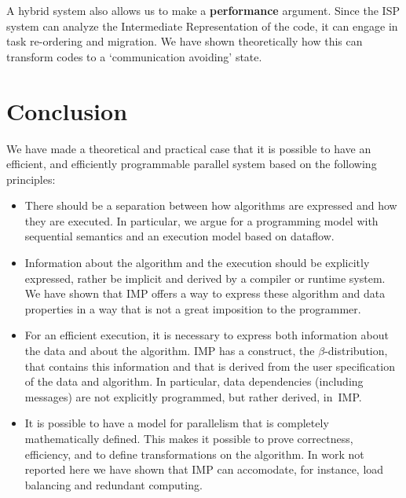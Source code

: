\documentclass[11pt,fleqn,preprint]{impreport}
\begin{document}
A hybrid system also allows us to make a \textbf{performance} argument. Since
the ISP system can analyze the Intermediate Representation of the
code, it can engage in task re-ordering and migration. We have shown
theoretically how this can transform codes to a `communication
avoiding' state.

\section{Conclusion}

We have made a theoretical and practical case that it is possible
to have an efficient, and efficiently programmable parallel system
based on the following principles:
\begin{itemize}
\item There should be a separation between how algorithms are expressed
  and how they are executed. In particular, we argue for a programming
  model with sequential semantics and an execution model based on dataflow.
\item Information about the algorithm and the execution should be
  explicitly expressed, rather be implicit and derived by a compiler
  or runtime system. We have shown that \ac{IMP} offers a way to
  express these algorithm and data properties in a way that is not a great
  imposition to the programmer.
\item For an efficient execution, it is necessary to express both
  information about the data and about the algorithm. \ac{IMP} has
  a construct, the $\beta$-distribution, that contains this information
  and that is derived from the user specification of the data and algorithm.
  In particular, data dependencies (including messages) are not explicitly
  programmed, but rather derived, in~\ac{IMP}.
\item It is possible to have a model for parallelism that is completely
  mathematically defined. This makes it possible to prove correctness, efficiency,
  and to define transformations on the algorithm. In work not reported here
  we have shown that \ac{IMP} can accomodate, for instance, load balancing
  and redundant computing.
\end{itemize}



\end{document}
